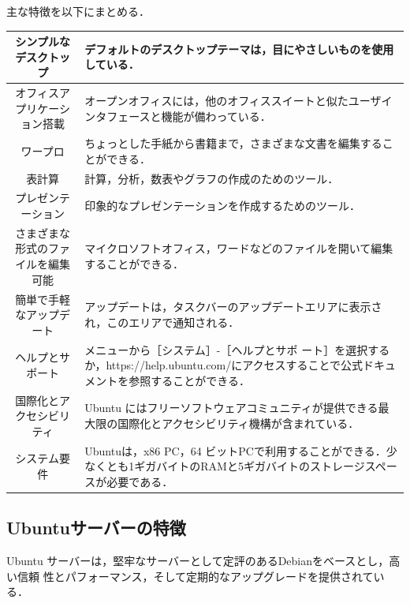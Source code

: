 主な特徴を以下にまとめる\cite{ubuntu}．


\begin{tabular}{|c|p{}|}
 \hline
 シンプルなデスクトップ & デフォルトのデスクトップテーマは，目にやさしいものを使用している．\\\hline
    オフィスアプリケーション搭載 & オープンオフィスには，他のオフィススイートと似たユーザインタフェースと機能が備わっている．\\\hline
    ワープロ & ちょっとした手紙から書籍まで，さまざまな文書を編集することができる．\\\hline
    表計算 & 計算，分析，数表やグラフの作成のためのツール． \\\hline
    プレゼンテーション & 印象的なプレゼンテーションを作成するためのツール．\\\hline
    さまざまな形式のファイルを編集可能 & マイクロソフトオフィス，ワードなどのファイルを開いて編集することができる．\\\hline
    簡単で手軽なアップデ ート & アップデートは，タスクバーのアップデートエリアに表示され，このエリアで通知される．\\\hline
   ヘルプとサポート & メニューから［システム］-［ヘルプとサポ ート］を選択するか，https://help.ubuntu.com/にアクセスすることで公式ドキュメントを参照することができる．\\\hline
国際化とアクセシビリティ & Ubuntu にはフリーソフトウェアコミュニティが提供できる最大限の国際化とアクセシビリティ機構が含まれている． \\\hline
  システム要件 & Ubuntuは，x86 PC，64 ビットPCで利用することができる．少なくとも1ギガバイトのRAMと5ギガバイトのストレージスペースが必要である．\\\hline
\end{tabular}

\subsection{Ubuntuサーバーの特徴 }
Ubuntu サーバーは，堅牢なサーバーとして定評のあるDebianをベースとし，高い信頼 性とパフォーマンス，そして定期的なアップグレードを提供されている\cite{ubuntu}．


